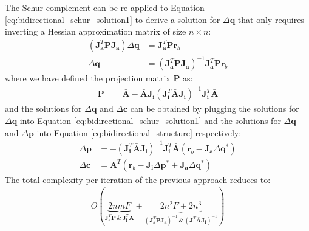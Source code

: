 The Schur complement can be re-applied to Equation \ref{eq:bidirectional_schur_solution1} to derive a solution for $\Delta\mathbf{q}$ that only requires inverting a Hessian approximation matrix of size $n \times n$:
\begin{equation}
    \begin{aligned}
        \left( \mathbf{J}_{\mathbf{a}}^T\mathbf{P}\mathbf{J}_{\mathbf{a}} \right) \Delta \mathbf{q} & = \mathbf{J}_{\mathbf{a}}^T\mathbf{P}\mathbf{r}_b
        \\
        \Delta \mathbf{q} & = \left( \mathbf{J}_{\mathbf{a}}^T\mathbf{P}\mathbf{J}_{\mathbf{a}} \right)^{-1} \mathbf{J}_{\mathbf{a}}^T\mathbf{P}\mathbf{r}_b
    \label{eq:bidirectional_schur_solution3}
    \end{aligned}
\end{equation}
where we have defined the projection matrix $\mathbf{P}$ as:
\begin{equation}
    \begin{aligned}
		\mathbf{P} &= \bar{\mathbf{A}} - \bar{\mathbf{A}}\mathbf{J}_{\mathbf{i}} \left( \mathbf{J}_{\mathbf{i}}^T\bar{\mathbf{A}}\mathbf{J}_{\mathbf{i}} \right)^{-1} \mathbf{J}_{\mathbf{i}}^T\bar{\mathbf{A}}
		\label{eq:bidirectional_schur_projection}
    \end{aligned}
\end{equation}
and the solutions for $\Delta\mathbf{q}$ and $\Delta\mathbf{c}$ can be obtained by plugging the solutions for $\Delta\mathbf{q}$ into Equation \ref{eq:bidirectional_schur_solution1} and the solutions for $\Delta\mathbf{q}$ and $\Delta\mathbf{p}$ into Equation \ref{eq:bidirectional_structure} respectively:
\begin{equation}
    \begin{aligned}
        \Delta \mathbf{p} & = -\left( \mathbf{J}_{\mathbf{i}}^T\bar{\mathbf{A}}\mathbf{J}_{\mathbf{i}} \right)^{-1} \mathbf{J}_{\mathbf{i}}^T\bar{\mathbf{A}} \left(\mathbf{r}_b - \mathbf{J}_{\mathbf{a}}\Delta \mathbf{q}^* \right)
        \\
        \Delta\mathbf{c} & = \mathbf{A}^T \left( \mathbf{r}_b - \mathbf{J}_{\mathbf{i}} \Delta\mathbf{p}^* + \mathbf{J}_{\mathbf{a}} \Delta\mathbf{q}^* \right)
    \label{eq:bidirectional_schur_solution4}
    \end{aligned}
\end{equation}
The total complexity per iteration of the previous approach reduces to:
\begin{equation}
    \begin{aligned}
        O(
        \underbrace{2nmF}_{
            \mathbf{J}_{\mathbf{a}}^T\mathbf{P}
            \, \& \,
            \mathbf{J}_{\mathbf{i}}^T\bar{\mathbf{A}}}
        +
        \underbrace{2n^2F + 2n^3}_{
            \left( \mathbf{J}_{\mathbf{a}}^T\mathbf{P}\mathbf{J}_{\mathbf{a}} \right)^{-1}
            \, \& \,
            \left( \mathbf{J}_{\mathbf{i}}^T \bar{\mathbf{A}} \mathbf{J}_{\mathbf{i}} \right)^{-1}}
        )
    \label{eq:complexity_schur_bidirectional2}
    \end{aligned}
\end{equation}
